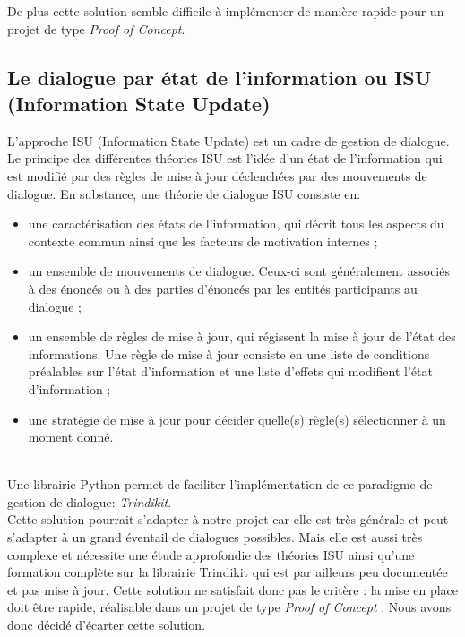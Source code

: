 De plus cette solution semble difficile à implémenter de manière rapide pour un projet de type \emph{Proof of Concept}.

\FloatBarrier

\subsection{Le dialogue par état de l'information ou ISU (Information State Update)}

L'approche ISU (Information State Update) est un cadre de gestion de dialogue. Le principe des différentes théories ISU est l'idée d'un état de l'information qui est modifié par des règles de mise à jour déclenchées par des mouvements de dialogue. En substance, une théorie de dialogue ISU consiste en:
\begin{itemize}
	\item une caractérisation des états de l'information, qui décrit tous les aspects du contexte commun ainsi que les facteurs de motivation internes ;
	\item un ensemble de mouvements de dialogue. Ceux-ci sont généralement associés à des énoncés ou à des parties d'énoncés par les entités participants au dialogue ;
	\item un ensemble de règles de mise à jour, qui régissent la mise à jour de l'état des informations. Une règle de mise à jour consiste en une liste de conditions préalables sur l'état d'information et une liste d'effets qui modifient l'état d'information ;
	\item une stratégie de mise à jour pour décider quelle(s) règle(s) sélectionner à un moment donné.
\end{itemize}

~\\\indent
Une librairie Python permet de faciliter l'implémentation de ce paradigme de gestion de dialogue: \textit{Trindikit}. \\
Cette solution pourrait s'adapter à notre projet car elle est très générale et peut s'adapter à un grand éventail de dialogues possibles. Mais elle est aussi très complexe et nécessite une étude approfondie des théories ISU ainsi qu'une formation complète sur la librairie Trindikit qui est par ailleurs peu documentée et pas mise à jour. Cette solution ne satisfait donc pas le critère : \og la mise en place doit être rapide, réalisable dans un projet de type \textit{Proof of Concept} \fg. Nous avons donc décidé d'écarter cette solution.



